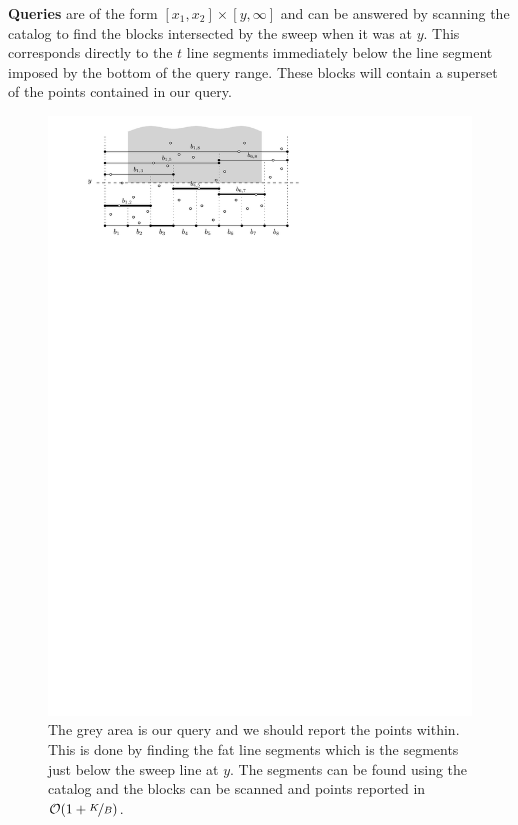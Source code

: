 \documentclass[twoside,11pt,openright]{report}
\begin{document}
\textbf{Queries} are of the form $[x_1,x_2] \times [y,\infty]$ and can be answered by scanning the catalog to find the blocks intersected by the sweep when it was at $y$. This corresponds directly to the $t$ line segments immediately below the line segment imposed by the bottom of the query range. These blocks will contain a superset of the points contained in our query.

\begin{figure}[h]
	\centering
	\includegraphics[scale=1]{../figures/sweep-line-with-query}
	\caption{The grey area is our query and we should report the points within. This is done by finding the fat line segments which is the segments just below the sweep line at $y$. The segments can be found using the catalog and the blocks can be scanned and points reported in $\mathcal{O}(1+\nicefrac{K}{B})$.}
	\label{fig:sweep-line-query}
\end{figure}
\end{document}
